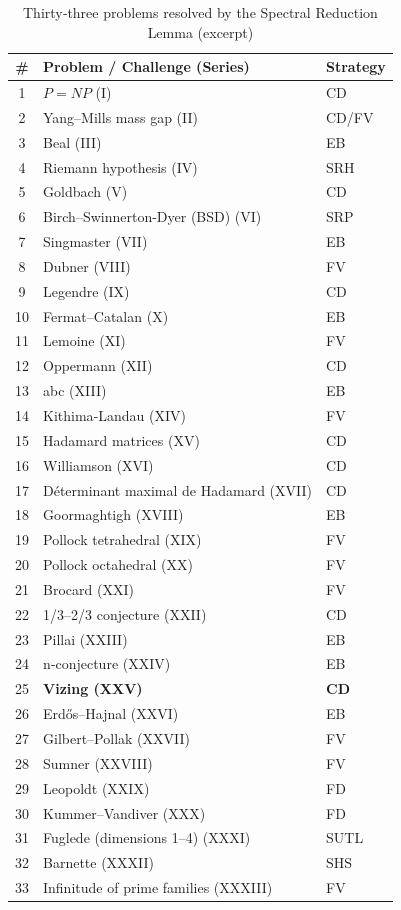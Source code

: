 \documentclass[11pt,a4paper]{article}
\begin{document}
\begin{center}
\small
\begin{longtable}{@{}cll@{}}
\caption{Thirty‑three problems resolved by the Spectral Reduction Lemma (excerpt)}\\
\toprule
\# & Problem / Challenge (Series) & Strategy \\
\midrule
1 & \(P = NP\) (I) & CD \\
2 & Yang–Mills mass gap (II) & CD/FV \\
3 & Beal (III) & EB \\
4 & Riemann hypothesis (IV) & SRH \\
5 & Goldbach (V) & CD \\
6 & Birch–Swinnerton-Dyer (BSD) (VI) & SRP \\
7 & Singmaster (VII) & EB \\
8 & Dubner (VIII) & FV \\
9 & Legendre (IX) & CD \\
10 & Fermat–Catalan (X) & EB \\
11 & Lemoine (XI) & FV \\
12 & Oppermann (XII) & CD \\
13 & abc (XIII) & EB \\
14 & Kithima‑Landau (XIV) & FV \\
15 & Hadamard matrices (XV) & CD \\
16 & Williamson (XVI) & CD \\
17 & Déterminant maximal de Hadamard (XVII) & CD \\
18 & Goormaghtigh (XVIII) & EB \\
19 & Pollock tetrahedral (XIX) & FV \\
20 & Pollock octahedral (XX) & FV \\
21 & Brocard (XXI) & FV \\
22 & 1/3–2/3 conjecture (XXII) & CD \\
23 & Pillai (XXIII) & EB \\
24 & n‑conjecture (XXIV) & EB \\
25 & \textbf{Vizing (XXV)} & \textbf{CD} \\
26 & Erdős–Hajnal (XXVI) & EB \\
27 & Gilbert–Pollak (XXVII) & FV \\
28 & Sumner (XXVIII) & FV \\
29 & Leopoldt (XXIX) & FD \\
30 & Kummer–Vandiver (XXX) & FD \\
31 & Fuglede (dimensions 1–4) (XXXI) & SUTL \\
32 & Barnette (XXXII) & SHS \\
33 & Infinitude of prime families (XXXIII) & FV \\
\bottomrule
\end{longtable}
\end{center}
\end{document}
